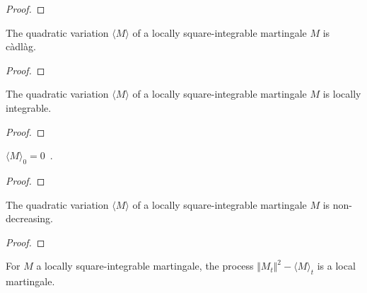 \begin{proof}

\end{proof}


\begin{lemma}\label{lem:cadlag_quadraticVariation}
The quadratic variation $\langle M \rangle$ of a locally square-integrable martingale $M$ is
càdlàg.
\end{lemma}

\begin{proof}

\end{proof}


\begin{lemma}\label{lem:locallyIntegrable_quadraticVariation}
The quadratic variation $\langle M \rangle$ of a locally square-integrable martingale $M$ is
locally integrable.
\end{lemma}

\begin{proof}

\end{proof}


\begin{lemma}\label{lem:quadraticVariation_zero}
$\langle M \rangle_0 = 0$~.
\end{lemma}

\begin{proof}

\end{proof}


\begin{lemma}\label{lem:monotone_quadraticVariation}
The quadratic variation $\langle M \rangle$ of a locally square-integrable martingale $M$ is
non-decreasing.
\end{lemma}

\begin{proof}

\end{proof}


\begin{lemma}\label{lem:local_martingale_sub_quadraticVariation}
For $M$ a locally square-integrable martingale, the process
$\Vert M_t \Vert^2 - \langle M \rangle_t$ is a local martingale.
\end{lemma}

